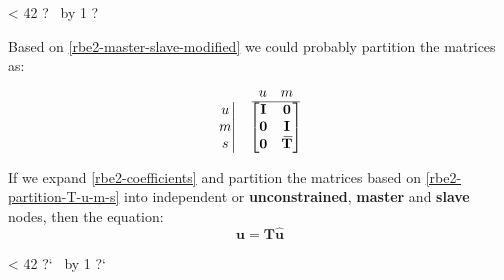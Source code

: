 \documentclass[10pt,b5paper,titlepage]{book}
\newcommand{\m}{\mathbf}
\newcommand{\closure}[2][3]{%
{}\mkern#1mu\overline{\mkern-#1mu#2}}
\newcommand{\repeatit}[3][10]{%
    \myloopcounter1%
    \loop\ifnum\myloopcounter < #1
    #2#3%
    \advance\myloopcounter by 1%
    \repeat%
    #2%
}
\newenvironment{qbox}
{
\begin{center}
    \repeatit[42]{?}{\ }
\end{center}
}
{
\begin{center}
    \repeatit[42]{?`}{\ }
\end{center}
}
\begin{document}
\begin{qbox}
    Based on \eqref{rbe2-master-slave-modified} we could probably partition
    the matrices as:
    \begin{equation}\label{rbe2-partition-T-u-m-s}
        \begin{matrix}
            \begin{matrix}
                \begin{matrix}
                    \ 
                \end{matrix} \\
                \left. \begin{matrix}
                    u \\
                    m \\
                    s \\
                \end{matrix} \right|
            \end{matrix}
            & \begin{matrix}
                \begin{matrix}
                    u & m \\
                    \hline
                \end{matrix} \\
                \begin{bmatrix}
                    \m{I} & \m{0} \\
                    \m{0} & \m{I} \\
                    \m{0} & \m{\closure{T}} \\
                \end{bmatrix} \\
            \end{matrix}
        \end{matrix}
    \end{equation}

    If we expand \eqref{rbe2-coefficients} and partition the matrices
    based on \eqref{rbe2-partition-T-u-m-s} into independent or
    \textbf{unconstrained}, \textbf{master}
    and \textbf{slave} nodes, then the equation:
    \begin{equation}
        \m{u} = \m{T} \m{\hat{u}}
    \end{equation}


\end{qbox}
\end{document}
